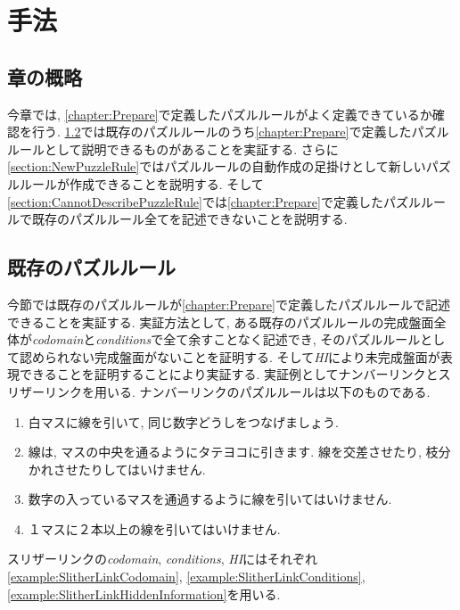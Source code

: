 \chapter{手法}\label{chapter:3}
\section{章の概略}
今章では, \cref{chapter:Prepare}で定義したパズルルールがよく定義できているか確認を行う. \cref{section:ExistsPuzzleRule}では既存のパズルルールのうち\cref{chapter:Prepare}で定義したパズルルールとして説明できるものがあることを実証する.  さらに\cref{section:NewPuzzleRule}ではパズルルールの自動作成の足掛けとして新しいパズルルールが作成できることを説明する.
そして\cref{section:CannotDescribePuzzleRule}では\cref{chapter:Prepare}で定義したパズルルールで既存のパズルルール全てを記述できないことを説明する.

\section{既存のパズルルール}\label{section:ExistsPuzzleRule}
今節では既存のパズルルールが\cref{chapter:Prepare}で定義したパズルルールで記述できることを実証する. 実証方法として, ある既存のパズルルールの完成盤面全体が\textit{codomain}と\textit{conditions}で全て余すことなく記述でき, そのパズルルールとして認められない完成盤面がないことを証明する. そして\textit{HI}により未完成盤面が表現できることを証明することにより実証する.
実証例としてナンバーリンクとスリザーリンクを用いる. ナンバーリンクのパズルルールは以下のものである\cite{web:NumberLink}.

\begin{enumerate}
  \item 白マスに線を引いて, 同じ数字どうしをつなげましょう.
  \item 線は, マスの中央を通るようにタテヨコに引きます. 線を交差させたり, 枝分かれさせたりしてはいけません.
  \item 数字の入っているマスを通過するように線を引いてはいけません.
  \item １マスに２本以上の線を引いてはいけません.
\end{enumerate}

\begin{example}[スリザーリンクの数学的記述]
  スリザーリンクの\textit{codomain}, \textit{conditions}, \textit{HI}にはそれぞれ\cref{example:SlitherLinkCodomain}, \cref{example:SlitherLinkConditions}, \cref{example:SlitherLinkHiddenInformation}を用いる.
\end{example}

